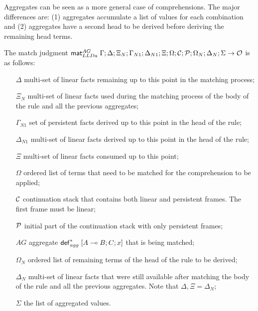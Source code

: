 Aggregates can be seen as a more general case of comprehensions. The major
differences are: (1) aggregates accumulate a list of values for each combination
and (2) aggregates have a second head to be derived before deriving the
remaining head terms.

The match judgment $\mathsf{mat}_{LLDa}^{AG} \; \Gamma; \Delta; \Xi_N; \Gamma_{N1};
\Delta_{N1}; \Xi; \Omega; \mathcal{C}; \mathcal{P}; \Omega_N; \Delta_N; \Sigma \rightarrow
\mathcal{O}$ is as follows:

\begin{enumerate}

   \item[$\Delta$] multi-set of linear facts remaining up to this point in the
   matching process;

   \item[$\Xi_N$] multi-set of linear facts used during the matching process of
   the body of the rule and all the previous aggregates;

   \item[$\Gamma_{N1}$] set of persistent facts derived up to this point in the
   head of the rule;

   \item[$\Delta_{N1}$] multi-set of linear facts derived up to this point in
   the head of the rule;

   \item[$\Xi$] multi-set of linear facts consumed up to this point;

   \item[$\Omega$] ordered list of terms that need to be matched for the
   comprehension to be applied;

   \item[$\mathcal{C}$] continuation stack that contains both linear and persistent
   frames. The first frame must be linear;

   \item[$\mathcal{P}$] initial part of the continuation stack with only persistent
   frames;

   \item[$AG$] aggregate $\mathsf{def}_{agg}^{*} \; [A \multimap B ; C; x]$ that is being matched;

   \item[$\Omega_N$] ordered list of remaining terms of the head of the rule to
   be derived;

   \item[$\Delta_N$] multi-set of linear facts that were still available after
   matching the body of the rule and all the previous aggregates. Note that
   $\Delta, \Xi = \Delta_N$;

   \item[$\Sigma$] the list of aggregated values.

\end{enumerate}


